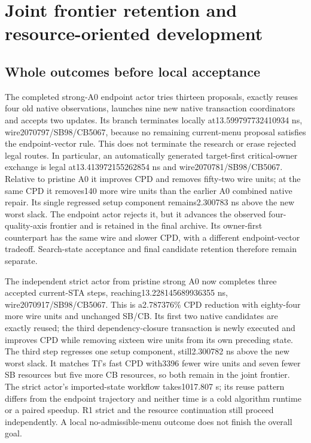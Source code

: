 
\section{Joint frontier retention and resource-oriented development}
\subsection{Whole outcomes before local acceptance}
The completed strong-A0 endpoint actor tries thirteen proposals, exactly reuses four old native observations, launches nine new native transaction coordinators and accepts two updates. Its branch terminates locally at13.599797732410934 ns, wire2070797/SB98/CB5067, because no remaining current-menu proposal satisfies the endpoint-vector rule. This does not terminate the research or erase rejected legal routes. In particular, an automatically generated target-first critical-owner exchange is legal at13.413972155262854 ns and wire2070781/SB98/CB5067. Relative to pristine A0 it improves CPD and removes fifty-two wire units; at the same CPD it removes140 more wire units than the earlier A0 combined native repair. Its single regressed setup component remains2.300783 ns above the new worst slack. The endpoint actor rejects it, but it advances the observed four-quality-axis frontier and is retained in the final archive. Its owner-first counterpart has the same wire and slower CPD, with a different endpoint-vector tradeoff. Search-state acceptance and final candidate retention therefore remain separate.

The independent strict actor from pristine strong A0 now completes three accepted current-STA steps, reaching13.228145689936355 ns, wire2070917/SB98/CB5067. This is a2.787376\% CPD reduction with eighty-four more wire units and unchanged SB/CB. Its first two native candidates are exactly reused; the third dependency-closure transaction is newly executed and improves CPD while removing sixteen wire units from its own preceding state. The third step regresses one setup component, still2.300782 ns above the new worst slack. It matches Tf's fast CPD with3396 fewer wire units and seven fewer SB resources but five more CB resources, so both remain in the joint frontier. The strict actor's imported-state workflow takes1017.807 s; its reuse pattern differs from the endpoint trajectory and neither time is a cold algorithm runtime or a paired speedup. R1 strict and the resource continuation still proceed independently. A local no-admissible-menu outcome does not finish the overall goal.

